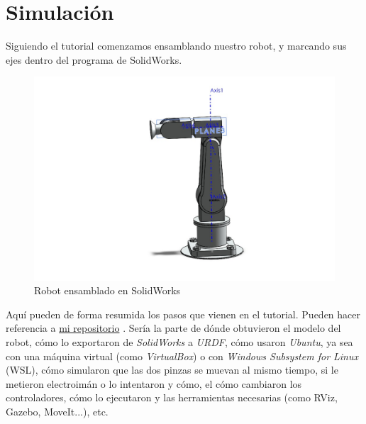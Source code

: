 \section{Simulación} \label{sec:simulacion}

Siguiendo el tutorial comenzamos ensamblando nuestro robot, y marcando sus ejes dentro del programa de SolidWorks.

\begin{figure}[h]
	\centering
	\includegraphics[width=\linewidth]{img/ROBOT SOLID}
	\caption{Robot ensamblado en SolidWorks}
	\label{fig:ROBOT SOLID}
\end{figure}














Aquí pueden de forma resumida los pasos que vienen en el tutorial. Pueden hacer referencia a \href{https://github.com/IvanMedinaGL/Robotica}{mi repositorio} \cite{medinagl_robotica}. Sería la parte de dónde obtuvieron el modelo del robot, cómo lo exportaron de \textit{SolidWorks} a \textit{URDF}, cómo usaron \textit{Ubuntu}, ya sea con una máquina virtual (como \textit{VirtualBox}) o con \textit{Windows Subsystem for Linux} (WSL), cómo simularon que las dos pinzas se muevan al mismo tiempo, si le metieron electroimán o lo intentaron y cómo, el cómo cambiaron los controladores, cómo lo ejecutaron y las herramientas necesarias (como RViz, Gazebo, MoveIt...), etc.